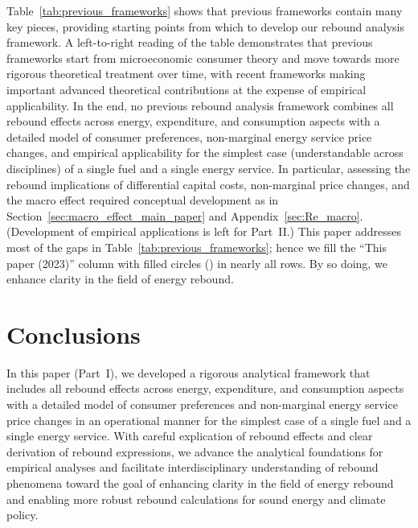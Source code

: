 \documentclass[12pt]{article}\usepackage[]{graphicx}\usepackage[]{xcolor}
\begin{document}
Table~\ref{tab:previous_frameworks} shows that 
previous frameworks contain many key pieces, 
providing starting points from which to develop 
our rebound analysis framework.
A left-to-right reading of the table 
demonstrates that previous frameworks start from microeconomic
consumer theory and move towards more rigorous theoretical treatment over time,
with recent frameworks making important advanced theoretical contributions
at the expense of empirical applicability.
In the end, no previous rebound analysis framework 
combines all rebound effects
across energy, expenditure, and consumption aspects with 
a detailed model of consumer preferences, 
non-marginal energy service price changes, and
empirical applicability 
for the simplest case (understandable across disciplines)
of a single fuel and a single energy service.
In particular, 
assessing the rebound implications of differential capital costs,
non-marginal price changes, and the macro effect
required conceptual development
as in Section~\ref{sec:macro_effect_main_paper} and Appendix~\ref{sec:Re_macro}.
(Development of empirical applications is left for Part~II.)
This paper addresses most of the gaps in Table~\ref{tab:previous_frameworks};
hence we fill the ``This paper (2023)'' column 
with filled circles ()
in nearly all rows.
By so doing, we enhance clarity in the field of energy rebound.


\section{Conclusions}
\label{sec:conclusion}

In this paper (Part~I),
we developed a rigorous analytical framework that
includes all rebound effects
across energy, expenditure, and consumption aspects with 
a detailed model of consumer preferences and
non-marginal energy service price changes
in an operational manner
for the 
simplest case of a single fuel and a single energy service.
With
careful explication of rebound effects and 
clear derivation of rebound expressions,
we advance the analytical foundations for empirical analyses and
facilitate interdisciplinary understanding of rebound phenomena
toward the goal of enhancing clarity in the field of energy rebound and
enabling more robust rebound calculations
for sound energy and climate policy.
\end{document}
